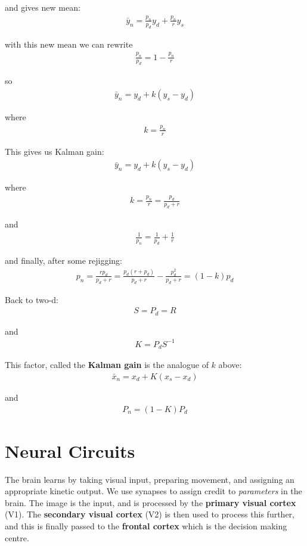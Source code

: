 \documentclass[11pt,a4paper,titlepage,dvipsnames,cmyk]{scrartcl}
\begin{document}
and gives new mean:
\begin{align*}
\bar y_n = \frac{p_n}{p_d}y_d + \frac{p_n}{r}y_s
\end{align*}

with this new mean we can rewrite
\begin{align*}
\frac{p_n}{p_d} = 1 - \frac{p_n}{r}
\end{align*}

so
\begin{align*}
\bar y_n = y_d + k(y_s - y_d)
\end{align*}

where
\begin{align*}
k = \frac{p_n}{r}
\end{align*}

This gives us Kalman gain:
\begin{align*}
\bar y_n = y_d + k(y_s - y_d)
\end{align*}

where
\begin{align*}
k = \frac{p_n}{r} = \frac{p_d}{p_d+r}
\end{align*}

and
\begin{align*}
\frac{1}{p_n} = \frac{1}{p_d} + \frac{1}{r}
\end{align*}

and finally, after some rejigging:
\begin{align*}
p_n = \frac{rp_d}{p_d + r} = \frac{p_d (r+p_d)}{p_d + r} - \frac{p^2_d}{p_d + r} = (1-k)p_d
\end{align*}

Back to two-d:
\begin{align*}
S = P_d = R
\end{align*}

and
\begin{align*}
K = P_d S^{-1}
\end{align*}

This factor, called the \textbf{Kalman gain} is the analogue of $k$ above:
\begin{align*}
\bar x_n = x_d + K(x_s - x_d)
\end{align*}

and
\begin{align*}
P_n = (1-K)P_d
\end{align*}

\section{Neural Circuits}
The brain learns by taking visual input, preparing movement, and assigning an appropriate kinetic output. We use synapses to assign credit to \textit{parameters} in the brain. The image is the input, and is processed by the \textbf{primary visual cortex} (V1). The \textbf{secondary visual cortex} (V2) is then used to process this further, and this is finally passed to the \textbf{frontal cortex} which is the decision making centre.
\end{document}

